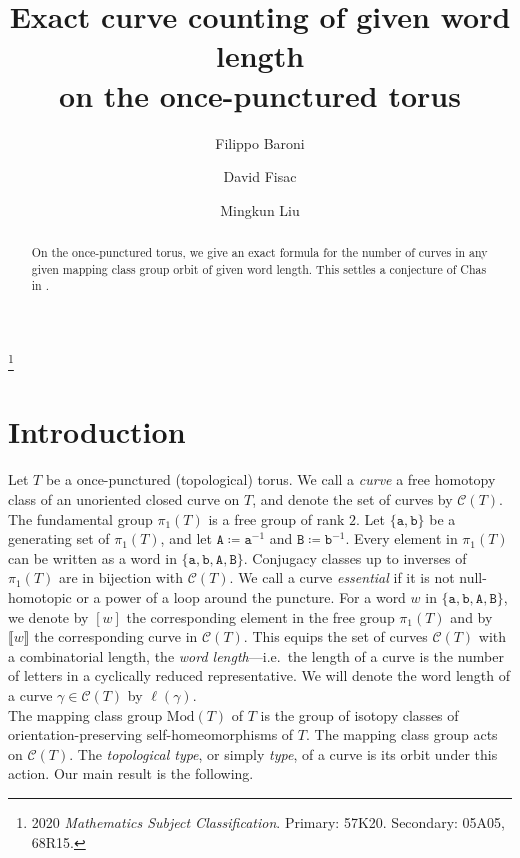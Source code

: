 \documentclass{article}
\title{Exact curve counting of given word length \\ on the once-punctured torus}
\author{Filippo Baroni \and David Fisac \and Mingkun Liu}
\date{}
\newcommand{\Mod}{\mathrm{Mod}}
\newcommand\blfootnote[1]{%
	\begingroup
	\renewcommand\thefootnote{}\footnote{#1}%
	\addtocounter{footnote}{-1}%
	\endgroup
}
\begin{document}
	\maketitle
	\blfootnote{2020 \textit{Mathematics Subject Classification}. Primary: 57K20. Secondary: 05A05, 68R15.}
	
	\begin{abstract}
		On the once-punctured torus, we give an exact formula for the number of curves in any given mapping class group orbit of given word length. This settles a conjecture of Chas in \cite{Chas}. 
	\end{abstract}
	
	\section{Introduction}
	
	Let $T$ be a once-punctured (topological) torus.
	We call a \emph{curve} a free homotopy class of an unoriented closed curve on $T$,
	and denote the set of curves by $\mathcal{C}(T)$.
	The fundamental group $\pi_1(T)$ is a free group of rank $2$.
	Let $\{ \mathtt{a}, \mathtt{b} \}$ be a generating set of $\pi_1(T)$,
	and let $\mathtt{A} \coloneqq \mathtt{a}^{-1}$ and $\mathtt{B} \coloneqq \mathtt{b}^{-1}$.
	Every element in $\pi_1(T)$ can be written as a word in $\{ \mathtt{a}, \mathtt{b}, \mathtt{A}, \mathtt{B} \}$.
	Conjugacy classes up to inverses of $\pi_1(T)$ are in bijection with $\mathcal{C}(T)$. We call a curve \emph{essential} if it is not null-homotopic or a power of a loop around the puncture. For a word $w$ in $\{\mathtt{a},\mathtt{b},\mathtt{A},\mathtt{B}\}$, we denote by $[w]$ the corresponding element in the free group $\pi_1(T)$ and by $\llbracket w\rrbracket$ the corresponding curve in $\mathcal{C}(T)$.  This equips the set of curves $\mathcal{C}(T)$ with a combinatorial length, the \emph{word length}---i.e.\ the length of a curve is the number of letters in a cyclically reduced representative. We will denote the word length of a curve $\gamma\in\mathcal{C}(T)$ by $\ell(\gamma)$.\\
	
	
	The mapping class group $\Mod(T)$ of $T$ is the group of isotopy classes of orientation-preserving self-homeomorphisms of $T$.	The mapping class group acts on $\mathcal{C}(T)$.
	The \emph{topological type}, or simply \emph{type}, of a curve is its orbit under this action.
	Our main result is the following.
	
\end{document}
